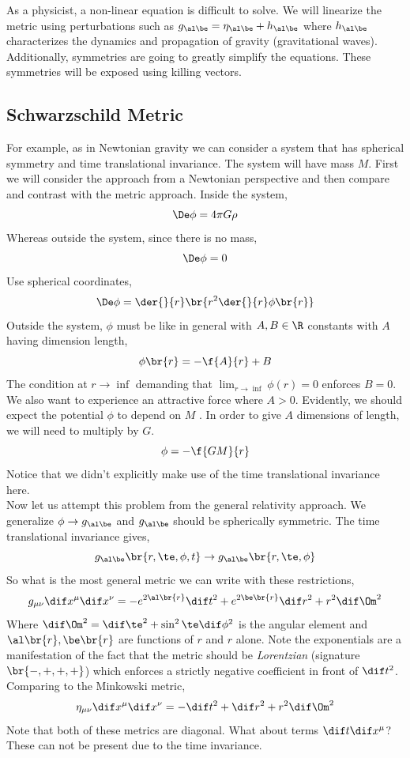 \documentclass{article}
\begin{document}
As a physicist, a non-linear equation is difficult to solve. We will linearize the metric using perturbations such as $g_{\al\be} = \eta_{\al\be} + h_{\al\be}$ where $h_{\al\be}$ characterizes the dynamics and propagation of gravity (gravitational waves).\\

Additionally, symmetries are going to greatly simplify the equations. These symmetries will be exposed using killing vectors. \\

\subsection{Schwarzschild Metric}
For example, as in Newtonian gravity we can consider a system that has spherical symmetry and time translational invariance. The system will have mass $M$. First we will consider the approach from a Newtonian perspective and then compare and contrast with the metric approach. Inside the system,
\[ \De \phi = 4 \pi G \rho \]
Whereas outside the system, since there is no mass,
\[ \De \phi = 0  \]
Use spherical coordinates,
\[ \De \phi = \der{}{r}\br{r^2 \der{}{r} \phi \br{r}} \]
Outside the system, $\phi$ must be like in general with $A,B \in \R$ constants with $A$ having dimension length,
\[ \phi\br{r} = - \f{A}{r} + B \]
The condition at $r \to \inf$ demanding that $\lim_{r\to\inf}\phi(r) = 0$ enforces $B = 0$. We also want to experience an attractive force where $A > 0$. Evidently, we should expect the potential $\phi$ to depend on $M$ . In order to give $A$ dimensions of length, we will need to multiply by $G$.
\[ \phi = - \f{GM}{r} \]
Notice that we didn't explicitly make use of the time translational invariance here.\\

Now let us attempt this problem from the general relativity approach. We generalize $\phi \to g_{\al\be}$ and $g_{\al\be}$ should be spherically symmetric. The time translational invariance gives,
\[ g_{\al\be}\br{r, \te, \phi, t} \to g_{\al\be}\br{r, \te, \phi} \]
So what is the most general metric we can write with these restrictions,
\[  g_{\mu\nu} \dif x^\mu \dif x^\nu = - e^{2\al\br{r}} \dif t^2 + e^{2\be\br{r}} \dif r^2 + r^2 \dif\Om^2\]
Where $\dif \Om^2 = \dif \te^2 + \sin^2 \te \dif \phi^2$ is the angular element and $\al\br{r},\be\br{r}$ are functions of $r$ and $r$ alone. Note the exponentials are a manifestation of the fact that the metric should be \textit{Lorentzian} (signature $\br{-,+,+,+}$) which enforces a strictly negative coefficient in front of $\dif t^2$. Comparing to the Minkowski metric,
\[ \eta_{\mu\nu} \dif x^\mu  \dif x^\nu = -\dif t^2 + \dif r^2 + r^2 \dif \Om^2\]
Note that both of these metrics are diagonal. What about terms $\dif t \dif x^\mu$? These can not be present due to the time invariance. \\
\end{document}
